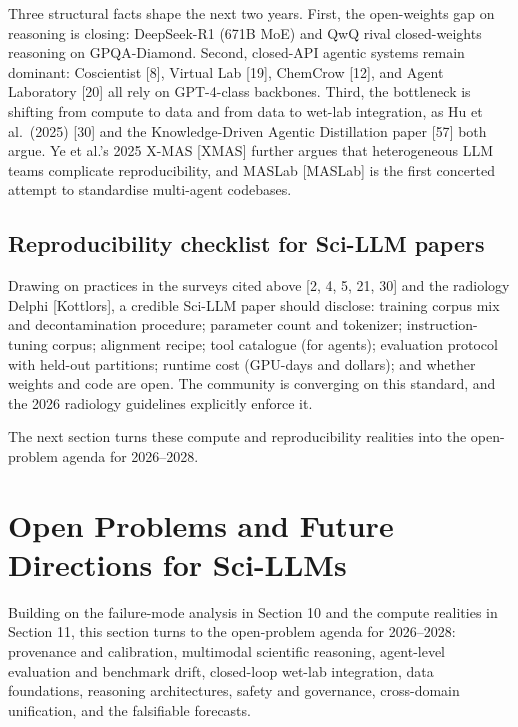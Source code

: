 Three structural facts shape the next two years. First, the open-weights gap on reasoning is closing: DeepSeek-R1 (671B MoE) and QwQ rival closed-weights reasoning on GPQA-Diamond. Second, closed-API agentic systems remain dominant: Coscientist {[}8{]}, Virtual Lab {[}19{]}, ChemCrow {[}12{]}, and Agent Laboratory {[}20{]} all rely on GPT-4-class backbones. Third, the bottleneck is shifting from compute to data and from data to wet-lab integration, as Hu et al.~(2025) {[}30{]} and the Knowledge-Driven Agentic Distillation paper {[}57{]} both argue. Ye et al.'s 2025 X-MAS {[}XMAS{]} further argues that heterogeneous LLM teams complicate reproducibility, and MASLab {[}MASLab{]} is the first concerted attempt to standardise multi-agent codebases.

\subsection{Reproducibility checklist for Sci-LLM papers}\label{reproducibility-checklist-for-sci-llm-papers}

Drawing on practices in the surveys cited above {[}2, 4, 5, 21, 30{]} and the radiology Delphi {[}Kottlors{]}, a credible Sci-LLM paper should disclose: training corpus mix and decontamination procedure; parameter count and tokenizer; instruction-tuning corpus; alignment recipe; tool catalogue (for agents); evaluation protocol with held-out partitions; runtime cost (GPU-days and dollars); and whether weights and code are open. The community is converging on this standard, and the 2026 radiology guidelines explicitly enforce it.

The next section turns these compute and reproducibility realities into the open-problem agenda for 2026--2028.

\section{Open Problems and Future Directions for Sci-LLMs}\label{open-problems-and-future-directions-for-sci-llms}

Building on the failure-mode analysis in Section 10 and the compute realities in Section 11, this section turns to the open-problem agenda for 2026--2028: provenance and calibration, multimodal scientific reasoning, agent-level evaluation and benchmark drift, closed-loop wet-lab integration, data foundations, reasoning architectures, safety and governance, cross-domain unification, and the falsifiable forecasts.

